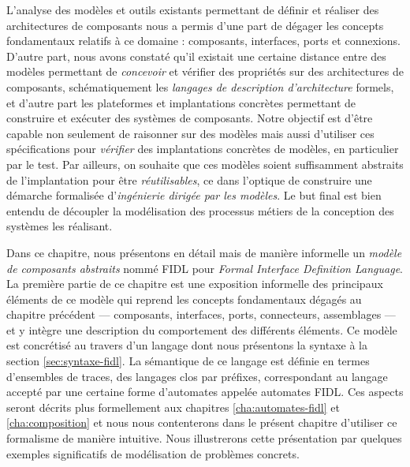 \lstset{basicstyle=\footnotesize\sffamily,frame=single}

L'analyse des mod\`eles et outils existants
permettant de d\'efinir et r\'ealiser des architectures de
composants nous a permis d'une part de d\'egager les concepts
fondamentaux relatifs \`a ce domaine : composants, interfaces, ports
et connexions. D'autre part, nous avons constat\'e qu'il existait une certaine distance entre des mod\`eles
permettant de \emph{concevoir} et v\'erifier des propri\'et\'es sur
des architectures de composants, sch\'ematiquement les \emph{langages de
description d'architecture} formels, et d'autre part les plateformes
et implantations concr\`etes permettant de construire et ex\'ecuter
des syst\`emes de composants. Notre objectif est d'\^etre capable
non seulement de raisonner sur des mod\`eles mais aussi d'utiliser
ces sp\'ecifications pour \emph{v\'erifier} des implantations
concr\`etes de mod\`eles, en particulier par le test. Par ailleurs, on souhaite que ces
mod\`eles soient suffisamment abstraits de l'implantation pour \^etre
\emph{r\'eutilisables}, ce dans l'optique de construire une
d\'emarche formalis\'ee d'\emph{ing\'enierie dirig\'ee par les
mod\`eles}. Le but final est bien entendu de d\'ecoupler la
mod\'elisation des processus m\'etiers de la conception des
syst\`emes les r\'ealisant.

Dans ce chapitre, nous pr\'esentons en d\'etail mais de mani\`ere
informelle un \emph{mod\`ele de
composants abstraits} nomm\'e \textsf{FIDL} pour \emph{Formal Interface
Definition Language}. La premi\`ere partie de ce chapitre est 
une exposition informelle des principaux \'el\'ements de ce
mod\`ele qui reprend les concepts
fondamentaux d\'egag\'es au chapitre pr\'ec\'edent --- composants,
interfaces, ports, connecteurs, assemblages --- et y int\`egre une
description du comportement des diff\'erents \'el\'ements. Ce mod\`ele est concr\'etis\'e au travers
d'un langage dont nous pr\'esentons la syntaxe \`a la section
\ref{sec:syntaxe-fidl}. La s\'emantique de ce langage est d\'efinie
en termes d'ensembles de traces, des langages clos par
pr\'efixes, correspondant au langage accept\'e par une certaine
forme d'automates appel\'ee automates \textsf{FIDL}. Ces
aspects seront d\'ecrits plus formellement aux chapitres
\ref{cha:automates-fidl} et \ref{cha:composition} et nous nous
contenterons dans le pr\'esent chapitre d'utiliser  ce formalisme de
mani\`ere intuitive. Nous illustrerons
cette pr\'esentation par quelques exemples 
significatifs de mod\'elisation de probl\`emes concrets.

